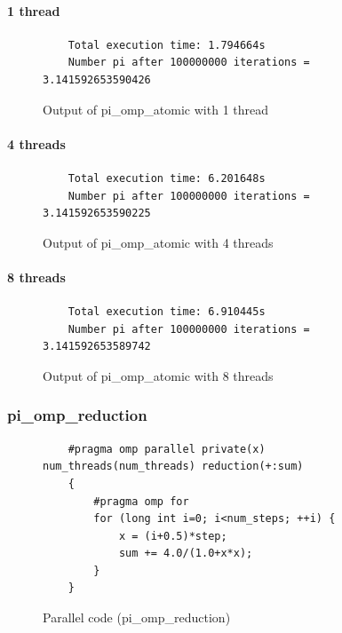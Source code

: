 \documentclass[12pt, a4paper]{article}
\begin{document}
\paragraph{1 thread}

\begin{figure}[H]
	\begin{lstlisting}
	Total execution time: 1.794664s
	Number pi after 100000000 iterations = 3.141592653590426		
	\end{lstlisting}
	\caption{Output of pi\_omp\_atomic with 1 thread}
\end{figure}

\paragraph{4 threads}

\begin{figure}[H]
	\begin{lstlisting}
	Total execution time: 6.201648s
	Number pi after 100000000 iterations = 3.141592653590225			
	\end{lstlisting}
	\caption{Output of pi\_omp\_atomic with 4 threads}
\end{figure}

\paragraph{8 threads}

\begin{figure}[H]
	\begin{lstlisting}
	Total execution time: 6.910445s
	Number pi after 100000000 iterations = 3.141592653589742
	\end{lstlisting}
	\caption{Output of pi\_omp\_atomic with 8 threads}
\end{figure}

\subsubsection{pi\_omp\_reduction}

\begin{figure}[H]
	\begin{lstlisting}
	#pragma omp parallel private(x) num_threads(num_threads) reduction(+:sum)
    {
        #pragma omp for 
        for (long int i=0; i<num_steps; ++i) {
            x = (i+0.5)*step;
	    	sum += 4.0/(1.0+x*x);
        }
    }

	\end{lstlisting}
	
	\caption{Parallel code (pi\_omp\_reduction)}
\end{figure}
\end{document}
